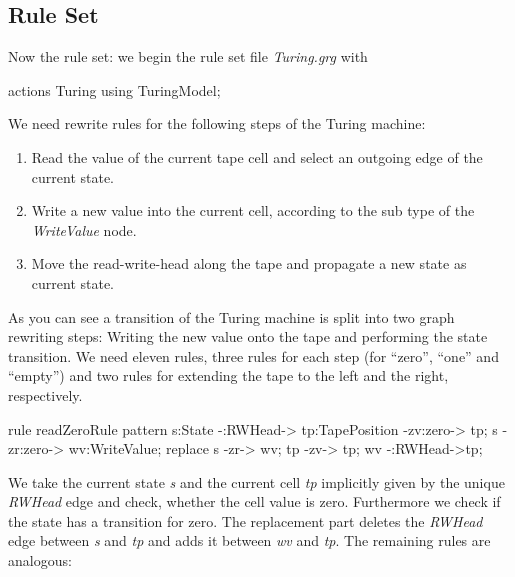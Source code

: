 \subsection{Rule Set}
Now the rule set: we begin the rule set file \emph{Turing.grg} with
\begin{grgen}[firstnumber=1] 
actions Turing using TuringModel;

\end{grgen}
We need rewrite rules for the following steps of the Turing machine:
\begin{enumerate}
  \item Read the value of the current tape cell and select an outgoing edge of the current state.
  \item Write a new value into the current cell, according to the sub type of the \emph{WriteValue} node.
  \item Move the read-write-head along the tape and propagate a new state as current state. 
\end{enumerate}
As you can see a transition of the Turing machine is split into two graph rewriting steps: Writing the new value onto the tape and performing the state transition. We need eleven rules, three rules for each step (for ``zero'', ``one'' and ``empty'') and two rules for extending the tape to the left and the right, respectively.
\begin{grgen}[firstnumber=last] 
rule readZeroRule {
	pattern {
		s:State -:RWHead-> tp:TapePosition -zv:zero-> tp;
		s -zr:zero-> wv:WriteValue;
	}
	replace {
		s -zr-> wv;
		tp -zv-> tp;
		wv -:RWHead->tp;
	}
}      

\end{grgen}
We take the current state \emph{s} and the current cell \emph{tp} implicitly given by the unique \emph{RWHead} edge and check, whether the cell value is zero. Furthermore we check if the state has a transition for zero. The replacement part deletes the \emph{RWHead} edge between \emph{s} and \emph{tp} and adds it between \emph{wv} and \emph{tp}. The remaining rules are analogous:
